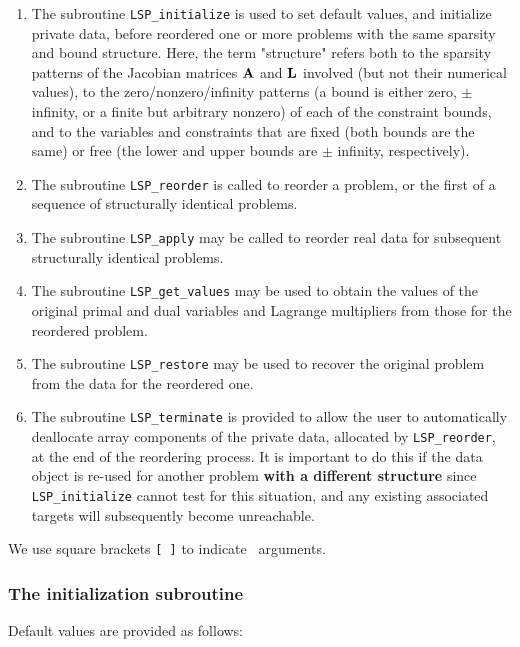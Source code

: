 \documentclass{galahad}
\newcommand{\packagename}{LSP}
\begin{document}
\begin{enumerate}
\item The subroutine 
  {\tt \packagename\_initialize} 
  is used to set default 
  values, and initialize private data, before reordered one or more problems 
  with the same sparsity and bound structure. 
  Here, the term "structure" refers both to 
  the sparsity patterns of the Jacobian matrices ${\mathbf{A}}$  and ${\mathbf{L}}$ 
  involved 
  (but not their numerical values), to the zero/nonzero/infinity patterns 
  (a bound is either zero, $\pm$ infinity, or a finite but arbitrary 
  nonzero) of each of the constraint bounds, and to the variables and 
  constraints that are fixed (both bounds are the same) or free 
  (the lower and upper bounds are $\pm$ infinity, respectively). 
 
\item The subroutine 
  {\tt \packagename\_reorder} 
  is called to reorder a problem, or the first of a sequence of structurally 
  identical problems. 
 
\item The subroutine 
  {\tt \packagename\_apply} 
  may be called to reorder real data for subsequent structurally identical 
  problems. 
 
\item The subroutine 
  {\tt \packagename\_get\_values} 
  may be used to obtain the values of the original primal and dual variables 
  and Lagrange multipliers from those for the reordered problem. 
 
\item The subroutine {\tt \packagename\_restore} may be used to recover the 
  original problem from the data for the reordered one. 
 
\item The subroutine 
  {\tt \packagename\_terminate} 
  is provided to allow the user to automatically deallocate array components 
  of the private data,  allocated by 
  {\tt \packagename\_reorder}, 
  at the end of the reordering process. It is important to do this if the data 
  object is re-used for another problem {\bf with a different structure} 
  since {\tt \packagename\_initialize} cannot test for this situation, 
  and any existing associated targets will subsequently become unreachable. 
\end{enumerate}
We use square brackets {\tt [ ]} to indicate \optional\ arguments.


\subsubsection{The initialization subroutine}\label{subinit}
 Default values are provided as follows:
\vspace*{1mm}
\end{document}
